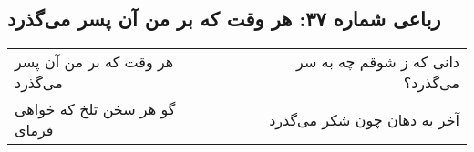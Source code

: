 \begin{center}
\section*{رباعی شماره ۳۷: هر وقت که بر من آن پسر می‌گذرد}
\label{sec:037}
\begin{longtable}{l p{0.5cm} r}
هر وقت که بر من آن پسر می‌گذرد
&&
دانی که ز شوقم چه به سر می‌گذرد؟
\\
گو هر سخن تلخ که خواهی فرمای
&&
آخر به دهان چون شکر می‌گذرد
\\
\end{longtable}
\end{center}
